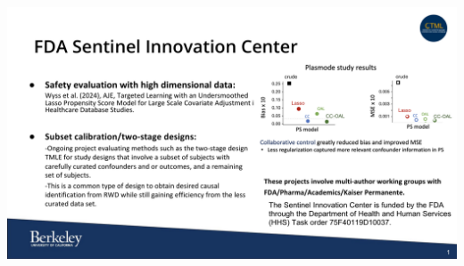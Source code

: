 \documentclass[t]{beamer}
\begin{document}
\begin{frame}
\frametitle{}
\vspace{20pt}
\begin{center}
\includegraphics[width=\textwidth]{figures/2-FDA-RWE-Subcommittee.pdf}
\end{center}
\vspace{35pt}
\end{frame}
\end{document}
